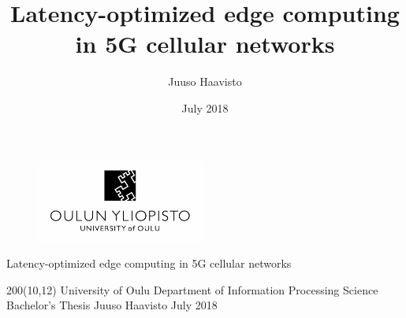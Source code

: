 \documentclass[12pt]{article}
\title{Latency-optimized edge computing in 5G cellular networks}
\author{Juuso Haavisto}
\date{July 2018}
\begin{document}
\renewcommand{\rmdefault}{phv} %
\renewcommand{\familydefault}{\rmdefault}

\begin{titlepage}


    \begin{figure}
      \centering
        \includegraphics[width=0.5\textwidth]{assets/univ.png}
    \end{figure}


    \begin{center}
        \selectfont
        \huge{Latency-optimized edge computing in 5G cellular networks}
    \end{center}

    \begin{textblock}{200}(10,12)%
    \obeylines
    \setlength{\parskip}{0cm}
        University of Oulu
        Department of Information Processing
        Science
        Bachelor's Thesis
        Juuso Haavisto
        July 2018
    \end{textblock}%

\end{titlepage}

\newpage
\end{document}
